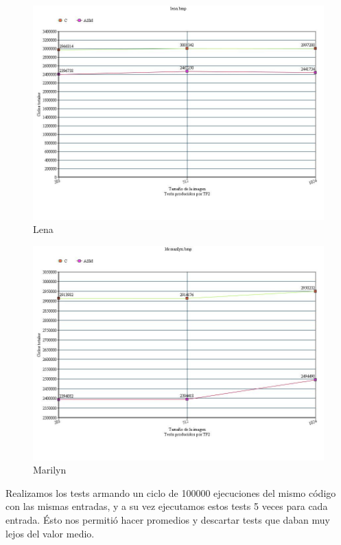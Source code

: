 \begin{figure}
  \begin{center}
	\includegraphics[scale=0.66]{imagenes/ldr-lena.jpg}
	\caption{Lena}
	\label{Lena}
  \end{center}
\end{figure}

\begin{figure}
  \begin{center}
	\includegraphics[scale=0.66]{imagenes/ldr-marilyn.jpg}
	\caption{Marilyn}
	\label{Marilyn}
  \end{center}
\end{figure}

Realizamos los tests armando un ciclo de 100000 ejecuciones del mismo c\'odigo con las mismas entradas, y a su vez ejecutamos estos tests 5 veces para cada entrada. \'Esto nos permiti\'o hacer promedios y descartar tests que daban muy lejos del valor medio.

